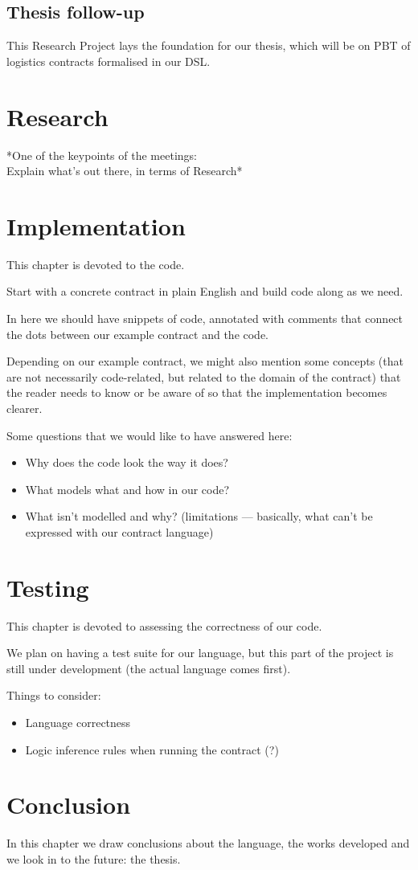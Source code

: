 \documentclass{ituthesis}
\begin{document}
\vspace{5mm} %

\section{Thesis follow-up}
This Research Project lays the foundation for our thesis, which will be on PBT of logistics contracts formalised in our DSL.


\chapter{Research}
*One of the keypoints of the meetings:\\
Explain what's out there, in terms of Research*

\chapter{Implementation}
This chapter is devoted to the code.\par
Start with a concrete contract in plain English and build code along as we need.\par
In here we should have snippets of code, annotated with comments that connect the dots between our example contract and the code.\par
Depending on our example contract, we might also mention some concepts (that are not necessarily code-related, but related to the domain of the contract) that the reader needs to know or be aware of so that the implementation becomes clearer.\par
Some questions that we would like to have answered here:
\begin{itemize}
    \item Why does the code look the way it does?
    \item What models what and how in our code?
    \item What isn't modelled and why? (limitations --- basically, what can't be expressed with our contract language)
\end{itemize}



\chapter{Testing}
This chapter is devoted to assessing the correctness of our code.\par
We plan on having a test suite for our language, but this part of the project is still under development (the actual language comes first).\par
Things to consider:
\begin{itemize}
    \item Language correctness
    \item Logic inference rules when running the contract (?)
\end{itemize}


\chapter{Conclusion}
In this chapter we draw conclusions about the language, the works developed and we look in to the future: the thesis.
\end{document}
